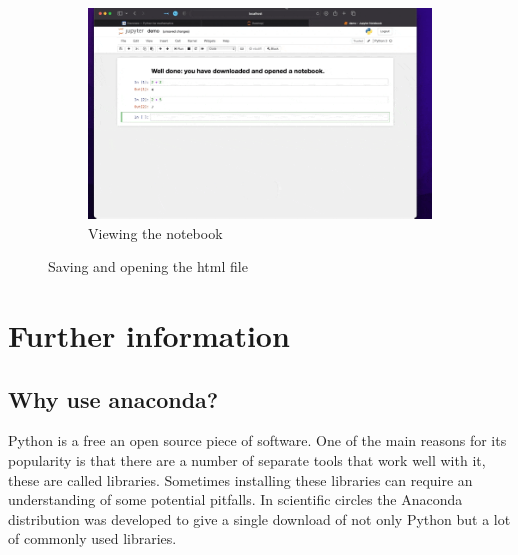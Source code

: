 \begin{enumerate}
\begin{figure}[!htbp]
                \begin{subfigure}[b]{0.3\textwidth}
                    \includegraphics[width=\textwidth]{assets/downloading_a_notebook/main00498.png}
                    \caption{Viewing the notebook}
                    \label{fig:viewing_the_notebook}
                \end{subfigure}
                \caption{Saving and opening the html file}
                \label{fig:downloading_a_notebook}
        \end{figure}

\end{enumerate}

\section{Further information}

\subsection{Why use anaconda?}

Python is a free an open source piece of software. One of the main reasons for
its popularity is that there are a number of separate tools that work well with
it, these are called libraries. Sometimes installing these libraries can require
an understanding of some potential pitfalls. In scientific circles the Anaconda
distribution was developed to give a single download of not only Python but a
lot of commonly used libraries.


